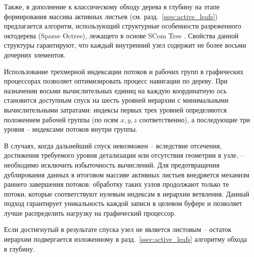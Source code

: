 Также, в дополнение к классическому обходу дерева в глубину на этапе формирования массива активных листьев (см. разд.~\ref{ssec:active_leafs}) предлагается алгоритм, использующий структурные особенности разреженного октодерева (Sparse Octree), лежащего в основе SCom Tree \cite{garifullin2025compact}. Свойства данной структуры гарантируют, что каждый внутренний узел содержит не более восьми дочерних элементов. 

Использование трехмерной индексации потоков и рабочих групп в графических процессорах позволяет оптимизировать процесс навигации по дереву. При назначении восьми вычислительных единиц на каждую координатную ось становится доступным спуск на шесть уровней иерархии с минимальными вычислительными затратами: индексы первых трех уровней определяются положением рабочей группы (по осям $x, y, z$ соответственно), а последующие три уровня -- индексами потоков внутри группы.

В случаях, когда дальнейший спуск невозможен -- вследствие отсечения, достижения требуемого уровня детализации или отсутствия геометрии в узле, -- необходимо исключить избыточность вычислений. Для предотвращения дублирования данных в итоговом массиве активных листьев внедряется механизм раннего завершения потоков: обработку таких узлов продолжают только те потоки, которые соответствуют нулевым индексам в иерархии ветвления. Данный подход гарантирует уникальность каждой записи в целевом буфере и позволяет лучше распределить нагрузку на графический процессор.

Если достигнутый в результате спуска узел не является листовым -- остаток иерархии подвергается изложенному в разд.~\ref{ssec:active_leafs} алгоритму обхода в глубину.

